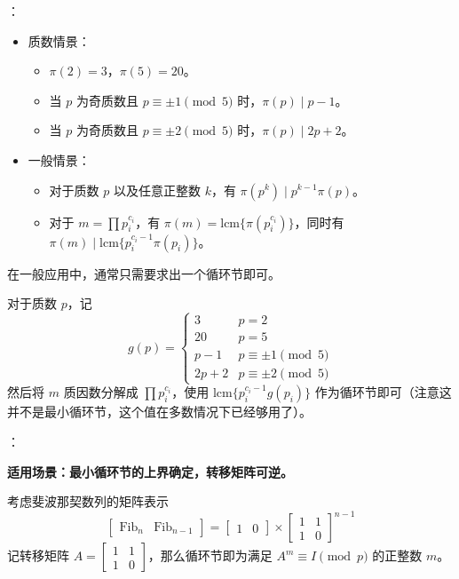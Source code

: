 ：

\begin{itemize}
    \item 质数情景：
    \begin{itemize}
        \item $\pi(2) = 3$，$\pi(5) = 20$。
        \item 当 $p$ 为奇质数且 $p \equiv \pm 1 \pmod 5$ 时，$\pi(p) \mid p - 1$。
        \item 当 $p$ 为奇质数且 $p \equiv \pm 2 \pmod 5$ 时，$\pi(p) \mid 2p + 2$。
    \end{itemize}
    \item 一般情景：
    \begin{itemize}
        \item 对于质数 $p$ 以及任意正整数 $k$，有 $\pi(p^k) \mid p^{k - 1}\pi(p)$。
        \item 对于 $m = \prod p_i^{c_i}$，有 $\pi(m) = \mathrm{lcm}\{ \pi(p_i^{c_i}) \}$，同时有 $\pi(m) \mid \mathrm{lcm}\{ p_i^{c_i - 1}\pi(p_i) \}$。
    \end{itemize}
\end{itemize}

在一般应用中，通常只需要求出一个循环节即可。

对于质数 $p$，记
\[
g(p) = \begin{cases} 3 & p = 2 \\
20 & p = 5 \\
p - 1 & p \equiv \pm 1 \pmod 5\\
2p + 2 & p \equiv \pm 2 \pmod 5
\end{cases}
\]
然后将 $m$ 质因数分解成 $\prod p_i^{c_i}$，使用 $\mathrm{lcm}\{ p_i^{c_i - 1}g(p_i) \}$ 作为循环节即可（注意这并不是最小循环节，这个值在多数情况下已经够用了）。

：

\begin{quoteblock}
\textbf{适用场景：最小循环节的上界确定，转移矩阵可逆。}
\end{quoteblock}

考虑斐波那契数列的矩阵表示
\[
\begin{bmatrix}
\mathrm{Fib}_n & \mathrm{Fib}_{n - 1}
\end{bmatrix}
=
\begin{bmatrix}
1 & 0
\end{bmatrix}
\times
\begin{bmatrix}
1 & 1 \\
1 & 0
\end{bmatrix}^{n - 1}
\]
记转移矩阵 $A = \begin{bmatrix} 1 & 1 \\ 1 & 0 \end{bmatrix}$，那么循环节即为满足 $A^m \equiv I \pmod p$ 的正整数 $m$。


